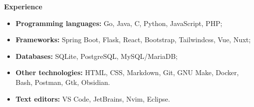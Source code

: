 {\vspace{0.5cm} \hspace{-0.5cm} \Large \textbf{Experience}}

\begin{itemize}
    \item \textbf{Programming languages:} Go, Java, C, Python, JavaScript, PHP;
    \item \textbf{Frameworks:} Spring Boot, Flask, React, Bootstrap, Tailwindcss, Vue, Nuxt;
    \item \textbf{Databases:} SQLite, PostgreSQL, MySQL/MariaDB;
    \item \textbf{Other technologies:} HTML, CSS, Markdown, Git, GNU Make, Docker, Bash, Postman, Gtk, Obsidian.
    \item \textbf{Text editors:} VS Code, JetBrains, Nvim, Eclipse.
\end{itemize}